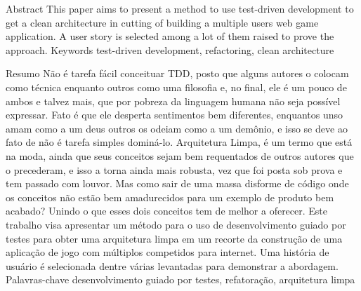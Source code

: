 \begin{singlespace}
  \resumo
    {Abstract}
    {This paper aims to present a method to use test-driven development to get a clean architecture in cutting of building a multiple users web game application. A user story is selected among a lot of them raised to prove the approach.}
    {Keywords}
    {test-driven development, refactoring, clean architecture}

  \resumo
    {Resumo}
    {
      Não é tarefa fácil conceituar TDD, posto que alguns autores o colocam como técnica enquanto outros como uma filosofia e, no final, ele é um pouco de ambos e talvez mais, que por pobreza da linguagem humana não seja possível expressar. Fato é que ele desperta sentimentos bem diferentes, enquantos unso amam como a um deus outros os odeiam como a um demônio, e isso se deve ao fato de não é tarefa simples dominá-lo.
      Arquitetura Limpa, é um termo que está na moda, ainda que seus conceitos sejam bem requentados de outros autores que o precederam, e isso a torna ainda mais robusta, vez que foi posta sob prova e tem passado com louvor.
      Mas como sair de uma massa disforme de código onde os conceitos não estão bem amadurecidos para um exemplo de produto bem acabado? Unindo o que esses dois conceitos tem de melhor a oferecer.
      Este trabalho visa apresentar um método para o uso de desenvolvimento guiado por testes para obter uma arquitetura limpa em um recorte da construção de uma aplicação de jogo com múltiplos competidos para internet. Uma história de usuário é selecionada dentre várias levantadas para demonstrar a abordagem.
    }
    {Palavras-chave}
    {desenvolvimento guiado por testes, refatoração, arquitetura limpa}
\end{singlespace}
